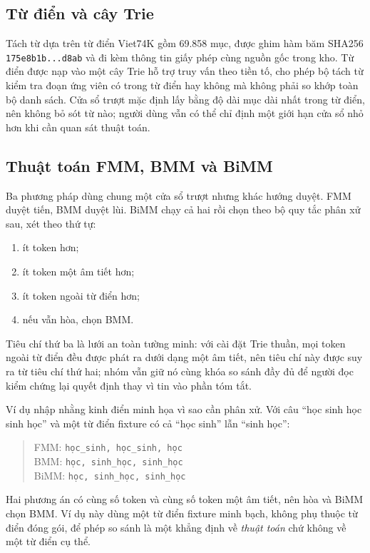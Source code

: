 \subsection{Từ điển và cây Trie}

Tách từ dựa trên từ điển Viet74K \cite{viet74k} gồm 69.858 mục, được ghim hàm băm
SHA256 \texttt{175e8b1b...d8ab} và đi kèm thông tin giấy phép cùng nguồn gốc trong
kho. Từ điển được nạp vào một cây Trie hỗ trợ truy vấn theo tiền tố, cho phép bộ
tách từ kiểm tra đoạn ứng viên có trong từ điển hay không mà không phải so khớp
toàn bộ danh sách. Cửa sổ trượt mặc định lấy bằng độ dài mục dài nhất trong từ
điển, nên không bỏ sót từ nào; người dùng vẫn có thể chỉ định một giới hạn cửa sổ
nhỏ hơn khi cần quan sát thuật toán.

\subsection{Thuật toán FMM, BMM và BiMM}

Ba phương pháp dùng chung một cửa sổ trượt nhưng khác hướng duyệt. FMM duyệt tiến,
BMM duyệt lùi. BiMM chạy cả hai rồi chọn theo bộ quy tắc phân xử sau, xét theo
thứ tự:

\begin{enumerate}
  \item ít token hơn;
  \item ít token một âm tiết hơn;
  \item ít token ngoài từ điển hơn;
  \item nếu vẫn hòa, chọn BMM.
\end{enumerate}

Tiêu chí thứ ba là lưới an toàn tường minh: với cài đặt Trie thuần, mọi token
ngoài từ điển đều được phát ra dưới dạng một âm tiết, nên tiêu chí này được suy ra
từ tiêu chí thứ hai; nhóm vẫn giữ nó cùng khóa so sánh đầy đủ để người đọc kiểm
chứng lại quyết định thay vì tin vào phần tóm tắt.

Ví dụ nhập nhằng kinh điển minh họa vì sao cần phân xử. Với câu ``học sinh học
sinh học'' và một từ điển fixture có cả ``học sinh'' lẫn ``sinh học'':

\begin{quote}
FMM: \texttt{học\_sinh, học\_sinh, học}\\
BMM: \texttt{học, sinh\_học, sinh\_học}\\
BiMM: \texttt{học, sinh\_học, sinh\_học}
\end{quote}

Hai phương án có cùng số token và cùng số token một âm tiết, nên hòa và BiMM chọn
BMM. Ví dụ này dùng một từ điển fixture minh bạch, không phụ thuộc từ điển đóng
gói, để phép so sánh là một khẳng định về \emph{thuật toán} chứ không về một từ
điển cụ thể.

